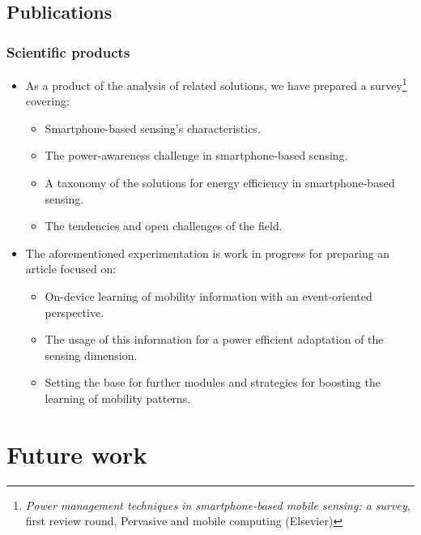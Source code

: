 \documentclass[compress,9pt,xcolor={dvipsnames,table}]{beamer}
\begin{document}
\subsection{Publications}
\begin{frame}[t]\frametitle{Scientific products}
\begin{itemize}
  \item As a product of the analysis of related solutions, we have prepared a survey\footnote{\tiny \emph{Power management techniques in smartphone-based mobile sensing: a survey}, first review round, Pervasive and mobile computing (Elsevier)} covering:
  \begin{itemize}
    \item Smartphone-based sensing's characteristics.
    \item The power-awareness challenge in smartphone-based sensing.
    \item A taxonomy of the solutions for energy efficiency in smartphone-based sensing.
    \item The tendencies and open challenges of the field.
  \end{itemize}
  \item The aforementioned experimentation is work in progress for preparing an article focused on:
  \begin{itemize}
    \item On-device learning of mobility information with an event-oriented perspective.
    \item The usage of this information for a power efficient adaptation of the sensing dimension.
    \item Setting the base for further modules and strategies for boosting the learning of mobility patterns.
  \end{itemize}
\end{itemize}
\end{frame}


\section{Future work}
\end{document}

